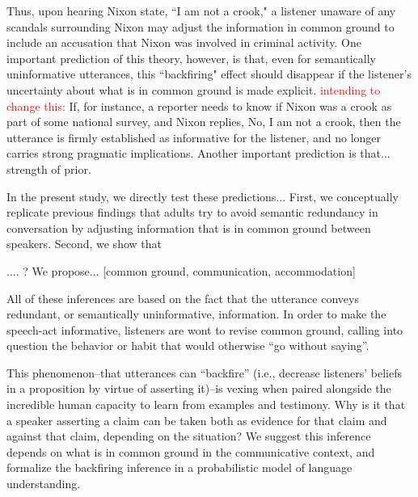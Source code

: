 \documentclass[10pt,letterpaper]{article}
\newcommand{\red}[1]{\textcolor{Red}{#1}}
\begin{document}
Thus, upon hearing Nixon state, ``I am not a crook," a listener unaware of any scandals surrounding Nixon may adjust the information in common ground to include an accusation that Nixon was involved in criminal activity.  One important prediction of this theory, however, is that, even for semantically uninformative utterances, this ``backfiring" effect should disappear if the listener's uncertainty about what is in common ground is made explicit.  \red{intending to change this:} If, for instance, a reporter needs to know if Nixon was a crook as part of some national survey, and Nixon replies, No, I am not a crook, then the utterance is firmly established as informative for the listener, and no longer carries strong pragmatic implications.  Another important prediction is that... strength of prior.

In the present study, we directly test these predictions... First, we conceptually replicate previous findings that adults try to avoid semantic redundancy in conversation by adjusting information that is in common ground between speakers.  Second, we show that 


.... ?  We propose... [common ground, communication, accommodation]
 
All of these inferences are based on the fact that the utterance conveys redundant, or semantically uninformative, information.
In order to make the speech-act informative, listeners are wont to revise common ground, calling into question the behavior or habit that would otherwise ``go without saying''.




This phenomenon--that utterances can ``backfire'' (i.e., decrease listeners' beliefs in a proposition by virtue of asserting it)--is vexing when paired alongside the incredible human capacity to learn from examples and testimony. 
Why is it that a speaker asserting a claim can be taken both as evidence for that claim and against that claim, depending on the situation? 
We suggest this inference depends on what is in common ground in the communicative context, and formalize the backfiring inference in a probabilistic model of language understanding.
\end{document}
